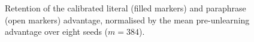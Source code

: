 \begin{figure}[t]
\centering

\caption{Retention of the calibrated literal (filled markers) and paraphrase (open markers)
advantage, normalised by the mean pre-unlearning advantage over eight seeds ($m=384$).}
\label{fig:retention}
\end{figure}
